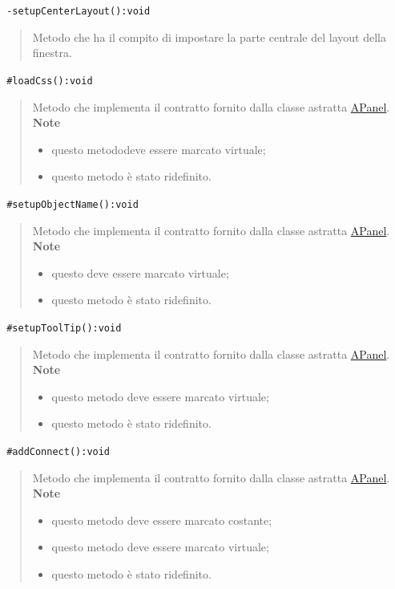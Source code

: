 \color{blue}\verb! -setupCenterLayout():void!
\begin{quote}
\color{black} Metodo che ha il compito di impostare la parte centrale del layout della finestra.
\end{quote} 
\color{blue}\verb! #loadCss():void!
\begin{quote}
\color{black} Metodo che implementa il contratto fornito dalla classe astratta \hyperref[speAPanel]{APanel}.\\
 \textbf{Note}
 \begin{itemize}
  \item questo metododeve essere marcato virtuale;
 \item questo metodo è stato ridefinito.
 \end{itemize}
\end{quote} 
\color{blue}\verb! #setupObjectName():void!
\begin{quote}
\color{black}Metodo che implementa il contratto fornito dalla classe astratta \hyperref[speAPanel]{APanel}.\\
 \textbf{Note}
 \begin{itemize}
  \item questo deve essere marcato virtuale;
 \item questo metodo è stato ridefinito.
 \end{itemize}
\end{quote} 
\color{blue}\verb! #setupToolTip():void!
\begin{quote}
\color{black}Metodo che implementa il contratto fornito dalla classe astratta \hyperref[speAPanel]{APanel}.\\
 \textbf{Note}
 \begin{itemize}
 \item questo metodo deve essere marcato virtuale;
 \item questo metodo è stato ridefinito.
 \end{itemize}
\end{quote} 
\color{blue}\verb! #addConnect():void!
\begin{quote}
\color{black}Metodo che implementa il contratto fornito dalla classe astratta \hyperref[speAPanel]{APanel}.\\
 \textbf{Note}
 \begin{itemize}
 \item questo metodo deve essere marcato costante;
 \item questo metodo deve essere marcato virtuale;
 \item questo metodo è stato ridefinito.
 \end{itemize}
\end{quote} 

